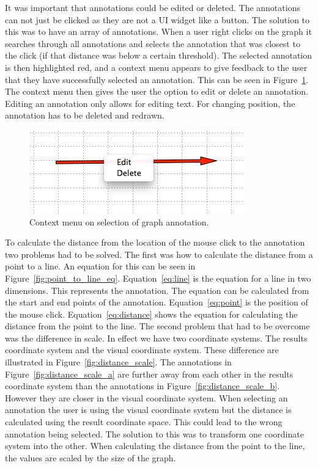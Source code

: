 It was important that annotations could be edited or deleted.  The annotations can not just be clicked as they are not a \ac{UI} widget like a button.  The solution to this was to have an array of annotations.  When a user right clicks on the graph it searches through all annotations and selects the annotation that was closest to the click (if that distance was below a certain threshold).  The selected annotation is then highlighted red, and a context menu appears to give feedback to the user that they have successfully selected an annotation.  This can be seen in Figure~\ref{fig:annotation_selection}.  The context menu then gives the user the option to edit or delete an annotation.  Editing an annotation only allows for editing text.  For changing position, the annotation has to be deleted and redrawn.

\begin{figure}[h!]
    \centering
    \includegraphics[width=\textwidth]{images/annotation_selection.png}
    \caption{Context menu on selection of graph annotation.}
    \label{fig:annotation_selection}
\end{figure}

To calculate the distance from the location of the mouse click to the annotation two problems had to be solved.  The first was how to calculate the distance from a point to a line.  An equation for this can be seen in Figure~\ref{fig:point_to_line_eq}.  Equation~\ref{eq:line} is the equation for a line in two dimensions.  This represents the annotation.  The equation can be calculated from the start and end points of the annotation. Equation~\ref{eq:point} is the position of the mouse click.  Equation~\ref{eq:distance} shows the equation for calculating the distance from the point to the line.  The second problem that had to be overcome was the difference in scale.  In effect we have two coordinate systems.  The results coordinate system and the visual coordinate system.  These difference are illustrated in Figure~\ref{fig:distance_scale}.  The annotations in Figure~\ref{fig:distance_scale_a} are further away from each other in the results coordinate system than the annotations in Figure~\ref{fig:distance_scale_b}. However they are closer in the visual coordinate system.  When selecting an annotation the user is using the visual coordinate system but the distance is calculated using the result coordinate space.  This could lead to the wrong annotation being selected.  The solution to this was to transform one coordinate system into the other.  When calculating the distance from the point to the line, the values are scaled by the size of the graph.

